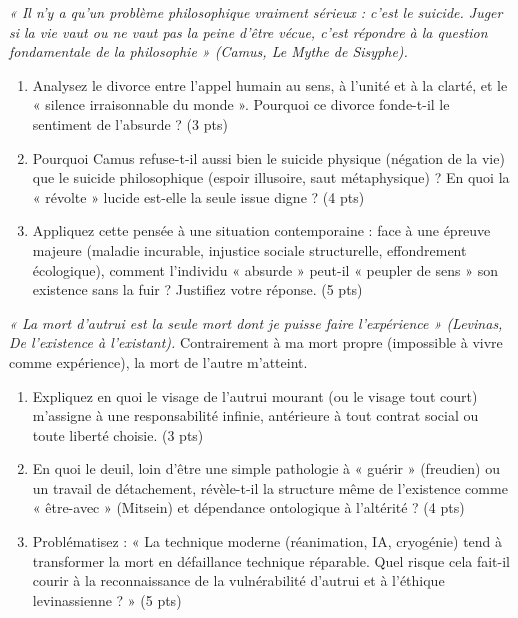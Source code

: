 \documentclass[11pt]{article}
\begin{document}
\begin{exercice}
\emph{« Il n'y a qu'un problème philosophique vraiment sérieux : c'est le suicide. Juger si la vie vaut ou ne vaut pas la peine d'être vécue, c'est répondre à la question fondamentale de la philosophie » (Camus, \textit{Le Mythe de Sisyphe}).}

\begin{enumerate}
    \item Analysez le divorce entre l'appel humain au sens, à l'unité et à la clarté, et le « silence irraisonnable du monde ». Pourquoi ce divorce fonde-t-il le sentiment de l'absurde ? (3 pts)
    \item Pourquoi Camus refuse-t-il aussi bien le suicide physique (négation de la vie) que le suicide philosophique (espoir illusoire, saut métaphysique) ? En quoi la « révolte » lucide est-elle la seule issue digne ? (4 pts)
    \item Appliquez cette pensée à une situation contemporaine : face à une épreuve majeure (maladie incurable, injustice sociale structurelle, effondrement écologique), comment l'individu « absurde » peut-il « peupler de sens » son existence sans la fuir ? Justifiez votre réponse. (5 pts)
\end{enumerate}
\end{exercice}

\begin{exercice}
\emph{« La mort d'autrui est la seule mort dont je puisse faire l'expérience » (Levinas, \textit{De l'existence à l'existant}).} Contrairement à ma mort propre (impossible à vivre comme expérience), la mort de l'autre m'atteint.

\begin{enumerate}
    \item Expliquez en quoi le visage de l'autrui mourant (ou le visage tout court) m'assigne à une responsabilité infinie, antérieure à tout contrat social ou toute liberté choisie. (3 pts)
    \item En quoi le deuil, loin d'être une simple pathologie à « guérir » (freudien) ou un travail de détachement, révèle-t-il la structure même de l'existence comme « être-avec » (Mitsein) et dépendance ontologique à l'altérité ? (4 pts)
    \item Problématisez : « La technique moderne (réanimation, IA, cryogénie) tend à transformer la mort en défaillance technique réparable. Quel risque cela fait-il courir à la reconnaissance de la vulnérabilité d'autrui et à l'éthique levinassienne ? » (5 pts)
\end{enumerate}
\end{exercice}
\end{document}
